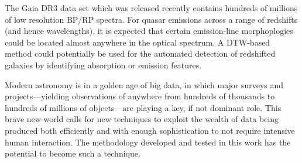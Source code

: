 The Gaia DR3 data set which was released recently \citep{2021} contains hundreds of millions of low resolution BP/RP spectra. For quasar emissions across a range of redshifts (and hence wavelengths), it is expected that certain emission-line morphoplogies could be located almost anywhere in the optical spectrum. A DTW-based method could potentially be used for the automated detection of redshifted galaxies by identifying absorption or emission features.


Modern astronomy is in a golden age of big data, in which major surveys and projects—yielding observations of anywhere from hundreds of thousands to hundreds of millions of objects—are playing a key, if not dominant role. This brave new world calls for new techniques to exploit the wealth of data being produced both efficiently and with enough sophistication to not require intensive human interaction. The methodology developed and tested in this work has the potential to become such a technique.